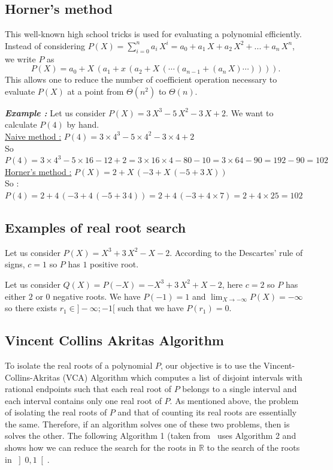 \subsection{Horner's method}

This well-known high school tricks is used for evaluating a polynomial
efficiently.
Instead of considering $P(X) = \sum_{i=0}^{n} a_i\, X^i = a_0 + a_1\, X + a_2\, X^2 + ... + a_n\, X^n$, we write $P$ as
$$P(X) = a_0 + X\, \left(a_1 + x\, \left(a_2 + X\,\left(\cdots \left(a_{n-1} + \left(a_n\, X\right)\cdots \right)\right)\right)\right).$$
This allows one to reduce the number of coefficient operation
necessary to evaluate $P(X)$ at a point 
from ${\Theta}(n^2)$ to  ${\Theta}(n)$.
 


\textit{\textbf{Example :}}
Let us consider $P(X) = 3\, X^3 - 5\,X^2 - 3\,X + 2$. We want to calculate $P(4)$ by hand.\\
\underline{Naive method :} $P(4) = 3\times 4^3 - 5\times 4^2 - 3\times 4 + 2$\\
So $P(4) = 3\times 4^3 - 5\times 16 - 12 + 2 = 3\times 16\times 4 - 80 - 10 = 3\times 64 - 90 = 192 - 90 = 102$\\
\underline{Horner's method :} $P(X) = 2 + X\, \left(-3 + X\, \left(-5 + 3\,X \right) \right)$\\
So :
$ P(4) = 2 + 4\, \left(-3 + 4\, \left(-5 + 3\,4 \right) \right) = 2 + 4\, \left(-3 + 4\times 7 \right) = 2 + 4\times 25 = 102 $\\


\subsection{Examples of real root search}
Let us consider $P(X) = X^3 + 3\, X^2 - X - 2$.
According to the Descartes' rule of signs, $c = 1$ so $P$ has $1$ positive root.

Let us consider $Q(X) = P(-X) = -X^3 + 3\, X^2 + X - 2$, here $c = 2$ so $P$ 
has either $2$ or $0$ negative roots. 
We have $P(-1) = 1$ and $\lim_{X \to -\infty} P(X) = -\infty$ 
so there exists $r_{1}\in ]-\infty; -1[$ such that we have $P(r_1) = 0$.


\subsection{Vincent Collins Akritas Algorithm}
To isolate the real roots of a polynomial $P$, our objective is to use the Vincent-Collins-Akritas (VCA) Algorithm which computes a list of disjoint intervals with rational endpoints such that each real root of $P$ belongs to a single interval and each interval contains only one real root of $P$. As mentioned above, the problem of isolating the real roots of $P$ and that of counting its real roots are essentially the same. Therefore, if an algorithm solves one of these two problems, then is solves the other. The following Algorithm 1  (taken from~\cite{CacheComp} uses Algorithm 2 and shows how we can reduce the search  for the roots in $\mathbb{R}$ to the search of the roots in $\left]0, 1\right[$.


